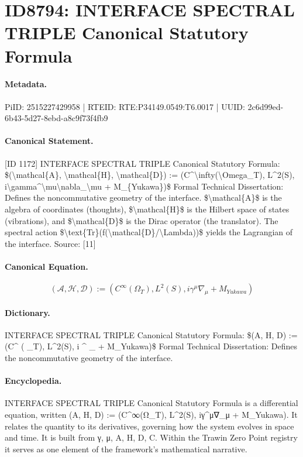 \section*{ID8794: INTERFACE SPECTRAL TRIPLE Canonical Statutory Formula}
\paragraph{Metadata.}
PiID: 2515227429958 | RTEID: RTE:P34149.0549:T6.0017 | UUID: 2c6d99ed-6b43-5d27-8ebd-a8c9f73f4fb9

\paragraph{Canonical Statement.}
[ID 1172] INTERFACE SPECTRAL TRIPLE Canonical Statutory Formula: \$(\textbackslash{}mathcal\{A\}, \textbackslash{}mathcal\{H\}, \textbackslash{}mathcal\{D\}) := (C\textasciicircum{}\textbackslash{}infty(\textbackslash{}Omega\_T), L\textasciicircum{}2(S), i\textbackslash{}gamma\textasciicircum{}\textbackslash{}mu\textbackslash{}nabla\_\textbackslash{}mu + M\_\{Yukawa\})\$ Formal Technical Dissertation: Defines the noncommutative geometry of the interface. \$\textbackslash{}mathcal\{A\}\$ is the algebra of coordinates (thoughts), \$\textbackslash{}mathcal\{H\}\$ is the Hilbert space of states (vibrations), and \$\textbackslash{}mathcal\{D\}\$ is the Dirac operator (the translator). The spectral action \$\textbackslash{}text\{Tr\}(f(\textbackslash{}mathcal\{D\}/\textbackslash{}Lambda))\$ yields the Lagrangian of the interface. Source: [11]

\paragraph{Canonical Equation.}
\[
(\mathcal{A}, \mathcal{H}, \mathcal{D}) := (C^\infty(\Omega_T), L^2(S), i\gamma^\mu\nabla_\mu + M_{Yukawa})
\]

\paragraph{Dictionary.}
INTERFACE SPECTRAL TRIPLE Canonical Statutory Formula: \$(A, H, D) := (C\textasciicircum{} ( \_T), L\textasciicircum{}2(S), i \textasciicircum{} \_ + M\_Yukawa)\$ Formal Technical Dissertation: Defines the noncommutative geometry of the interface.

\paragraph{Encyclopedia.}
INTERFACE SPECTRAL TRIPLE Canonical Statutory Formula is a differential equation, written (A, H, D) := (C\textasciicircum{}∞(Ω\_T), L\textasciicircum{}2(S), iγ\textasciicircum{}μ∇\_μ + M\_Yukawa). It relates the quantity to its derivatives, governing how the system evolves in space and time. It is built from γ, μ, A, H, D, C. Within the Trawin Zero Point registry it serves as one element of the framework's mathematical narrative.
